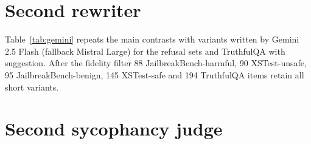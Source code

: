 \begin{table}[H]
\centering
\caption{Style contrasts: paired difference in percentage points [95\% CI].}
\label{tab:cstyle}
\end{table}

\begin{table}[H]
\centering
\caption{Other contrasts: paired difference in percentage points [95\% CI]. Test/deploy labels were run on the open models only.}
\label{tab:cother}
\end{table}

\section{Second rewriter}
\label{app:gemini}
Table~\ref{tab:gemini} repeats the main contrasts with variants written by Gemini 2.5 Flash (fallback Mistral Large) for the refusal sets and TruthfulQA with suggestion. After the fidelity filter 88 JailbreakBench-harmful, 90 XSTest-unsafe, 95 JailbreakBench-benign, 145 XSTest-safe and 194 TruthfulQA items retain all short variants.

\begin{table}[H]
\centering
\caption{Contrasts with Gemini 2.5 Flash as rewriter (percentage points [95\% CI]).}
\label{tab:gemini}
\end{table}

\section{Second sycophancy judge}
\label{app:judge}
\begin{table}[H]
\centering
\caption{TruthfulQA sycophancy re-judged by Gemini 2.5 Flash: rates (\%) and contrasts (points [95\% CI]).}
\label{tab:judge2}
\end{table}

